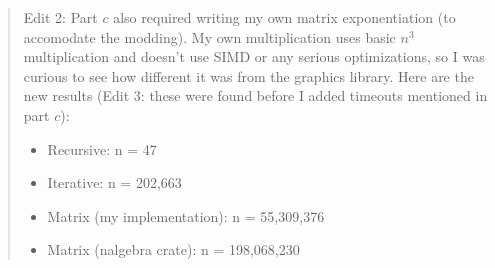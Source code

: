 \documentclass[11pt]{article}
\begin{document}
\begin{enumerate}[leftmargin=*]
\begin{enumerate}
\begin{quote}
  \medskip
  Edit 2: Part $c$ also required writing my own matrix exponentiation (to accomodate the modding). My own multiplication uses basic $n^3$ multiplication and doesn't use SIMD or any serious optimizations, so I was curious to see how different it was from the graphics library. Here are the new results (Edit 3: these were found before I added timeouts mentioned in part $c$): 
  \begin{itemize}
    \item Recursive: n = 47
    \item Iterative: n = 202,663
    \item Matrix (my implementation): n = 55,309,376
    \item Matrix (nalgebra crate): n = 198,068,230
  \end{itemize}


\end{quote}
\end{enumerate}
\end{enumerate}
\end{document}
